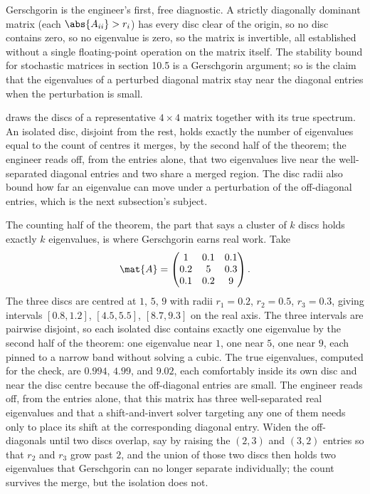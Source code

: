 Gerschgorin is the engineer's first, free diagnostic. A strictly
diagonally dominant matrix (each $\abs{A_{ii}} > r_{i}$) has every
disc clear of the origin, so no disc contains zero, so no eigenvalue
is zero, so the matrix is invertible, all established without a
single floating-point operation on the matrix itself. The stability
bound for stochastic matrices in section 10.5 is a Gerschgorin
argument; so is the claim that the eigenvalues of a perturbed
diagonal matrix stay near the diagonal entries when the
perturbation is small.



 draws the discs of a
representative $4 \times 4$ matrix together with its true spectrum. An
isolated disc, disjoint from the rest, holds exactly the number of
eigenvalues equal to the count of centres it merges, by the second
half of the theorem; the engineer reads off, from the entries alone,
that two eigenvalues live near the well-separated diagonal entries and
two share a merged region. The disc radii also bound how far an
eigenvalue can move under a perturbation of the off-diagonal entries,
which is the next subsection's subject.

\begin{example}
The counting half of the theorem, the part that says a cluster of $k$
discs holds exactly $k$ eigenvalues, is where Gerschgorin earns real
work. Take
\[
\mat{A} = \begin{pmatrix} 1 & 0.1 & 0.1 \\ 0.2 & 5 & 0.3 \\
0.1 & 0.2 & 9 \end{pmatrix}.
\]
The three discs are centred at $1$, $5$, $9$ with radii $r_1 = 0.2$,
$r_2 = 0.5$, $r_3 = 0.3$, giving intervals $[0.8, 1.2]$, $[4.5, 5.5]$,
$[8.7, 9.3]$ on the real axis. The three intervals are pairwise
disjoint, so each isolated disc contains exactly one eigenvalue by the
second half of the theorem: one eigenvalue near $1$, one near $5$, one
near $9$, each pinned to a narrow band without solving a cubic. The
true eigenvalues, computed for the check, are $0.994$, $4.99$, and
$9.02$, each comfortably inside its own disc and near the disc centre
because the off-diagonal entries are small. The engineer reads off,
from the entries alone, that this matrix has three well-separated real
eigenvalues and that a shift-and-invert solver targeting any one of
them needs only to place its shift at the corresponding diagonal entry.
Widen the off-diagonals until two discs overlap, say by raising the
$(2,3)$ and $(3,2)$ entries so that $r_2$ and $r_3$ grow past $2$, and
the union of those two discs then holds two eigenvalues that
Gerschgorin can no longer separate individually; the count survives the
merge, but the isolation does not.
\end{example}

